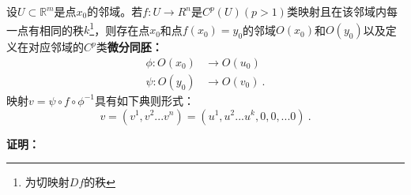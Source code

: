 

\begin{issues}
\issueDraft
\end{issues}

\begin{theorem}{}
设$U\subset \mathbb R^m$是点$x_0$的邻域。若$f:U\rightarrow R^n$是$ C^p(U)(p>1)$类映射且在该邻域内每一点有相同的秩$k$\footnote{为切映射$Df$的秩}，则存在点$x_0$和点$f(x_0)=y_0$的邻域$O(x_0)$和$O(y_0)$以及定义在对应邻域的$C^p$类\textbf{微分同胚：}
\begin{equation}
\begin{aligned}
\phi:O(x_0) &\rightarrow O(u_0)\\
\psi:O(y_0) &\rightarrow O(v_0)~.
\end{aligned}
\end{equation}
映射$v=\psi\circ f\circ \phi^{-1}$具有如下典则形式：
\begin{equation}
v=(v^1,v^2...v^n)=(u^1,u^2...u^k,0,0,...0)~.
\end{equation}
\end{theorem}
\textbf{证明：}